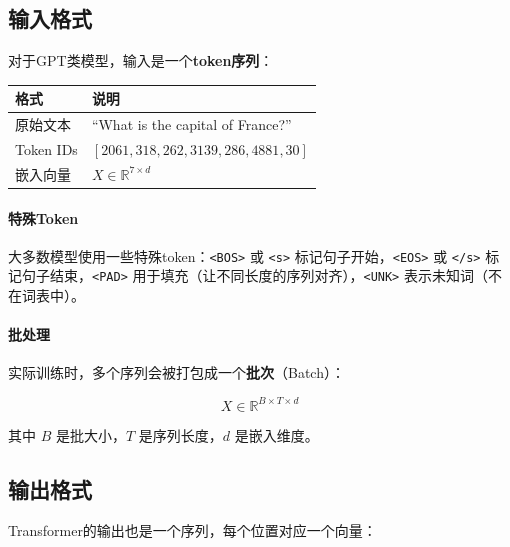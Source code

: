 \subsection{输入格式}

对于GPT类模型，输入是一个\textbf{token序列}：

\begin{center}
\begin{tabular}{ll}
\toprule
格式 & 说明 \\
\midrule
原始文本 & “What is the capital of France?” \\
Token IDs & $[2061, 318, 262, 3139, 286, 4881, 30]$ \\
嵌入向量 & $X \in \mathbb{R}^{7 \times d}$ \\
\bottomrule
\end{tabular}
\end{center}

\paragraph{特殊Token}

大多数模型使用一些特殊token：\texttt{<BOS>} 或 \texttt{<s>} 标记句子开始，\texttt{<EOS>} 或 \texttt{</s>} 标记句子结束，\texttt{<PAD>} 用于填充（让不同长度的序列对齐），\texttt{<UNK>} 表示未知词（不在词表中）。

\paragraph{批处理}

实际训练时，多个序列会被打包成一个\textbf{批次}（Batch）：

\begin{equation}
    X \in \mathbb{R}^{B \times T \times d}
\end{equation}

其中 $B$ 是批大小，$T$ 是序列长度，$d$ 是嵌入维度。

\subsection{输出格式}

Transformer的输出也是一个序列，每个位置对应一个向量：

